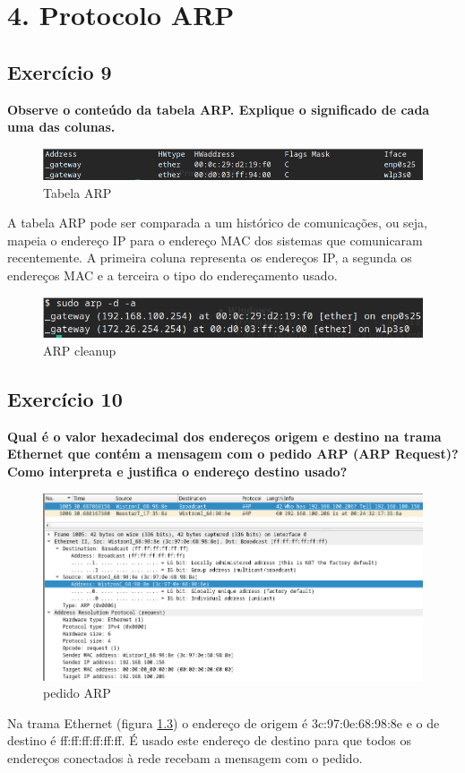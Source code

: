 \documentclass[a4paper]{report}
\begin{document}
\chapter{4. Protocolo ARP}
\section{Exercício 9}
\textbf{Observe o conteúdo da tabela ARP. Explique o significado de cada uma
das colunas.}

\begin{figure}[H]
    \centering 
    \includegraphics[width=\textwidth]{images/tabelaArp.png}
    \caption{Tabela ARP}
    \label{fig:tabelaArp}
\end{figure}
A tabela ARP pode ser comparada a um histórico de comunicações, ou seja, mapeia
o endereço IP para o endereço MAC dos sistemas que comunicaram recentemente.
A primeira coluna representa os endereços IP, a segunda os endereços MAC e 
a terceira o tipo do endereçamento usado.

\begin{figure}[H]
    \centering 
    \includegraphics[width=\textwidth]{images/arpCleanup.png}
    \caption{ARP cleanup}
    \label{fig:arpCleanup}
\end{figure}

\section{Exercício 10}
\textbf{Qual é o valor hexadecimal dos endereços origem e destino na trama
Ethernet que contém a mensagem com o pedido ARP (ARP Request)? Como interpreta e
justifica o endereço destino usado?}

\begin{figure}[H]
    \centering 
    \includegraphics[width=\textwidth]{images/ex10.png}
    \caption{pedido ARP}
    \label{fig:ex10}
\end{figure}
Na trama Ethernet (figura \ref{fig:ex10}) o endereço de origem é
3c:97:0e:68:98:8e e o de destino é ff:ff:ff:ff:ff:ff. É usado este endereço de
destino para que todos os endereços conectados à rede recebam a mensagem com o
pedido.
\end{document}
